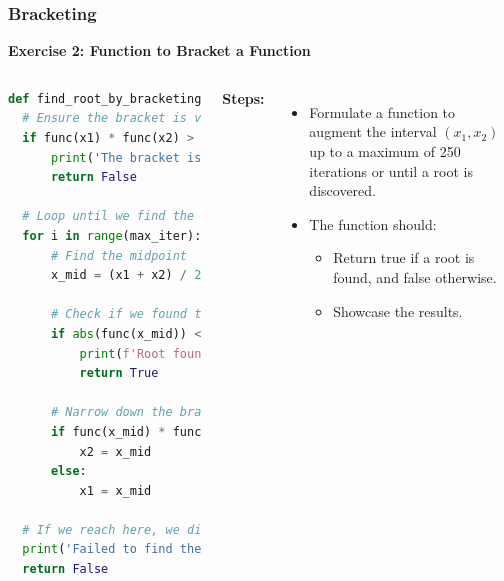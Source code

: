   \begin{frame}[fragile]
    \frametitle{Bracketing}
    
    \textbf{Exercise 2: Function to Bracket a Function}
    \begin{columns}
      \begin{lstlisting}[language=Python,basicstyle=\tiny]
def find_root_by_bracketing(func, x1, x2, tol=1e-6, max_iter=1000):
  # Ensure the bracket is valid
  if func(x1) * func(x2) > 0:
      print('The bracket is invalid. The function must have opposite signs at the two endpoints.')
      return False

  # Loop until we find the root or exceed the maximum number of iterations
  for i in range(max_iter):
      # Find the midpoint
      x_mid = (x1 + x2) / 2
      
      # Check if we found the root
      if abs(func(x_mid)) < tol:
          print(f'Root found: {x_mid}')
          return True
      
      # Narrow down the bracket
      if func(x_mid) * func(x1) < 0:
          x2 = x_mid
      else:
          x1 = x_mid

  # If we reach here, we did not find the root within the maximum number of iterations
  print('Failed to find the root within the maximum number of iterations.')
  return False
      \end{lstlisting}
      \textbf{Steps:}
      \begin{itemize}
        \item Formulate a function to augment the interval \((x_1, x_2)\) up to a maximum of 250 iterations or until a root is discovered.
        \item The function should:
          \begin{itemize}
            \item Return true if a root is found, and false otherwise.
            \item Showcase the results.
          \end{itemize}
      \end{itemize}
    \end{columns}
  \end{frame}

